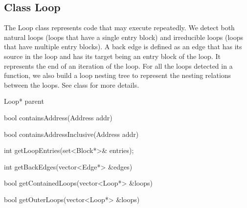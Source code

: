 \subsection{Class Loop}


The Loop class represents code that may execute repeatedly.
We detect both natural loops (loops that have a single entry block)
and irreducible loops (loops that have multiple entry blocks).
A back edge is defined as an edge that has its source in
the loop and has its target being an entry block of the loop.
It represents the end of an iteration of the loop.
For all the loops detected in a function, we also build a loop nesting 
tree to represent the nesting relations between the loops.
See class  for more details.

\begin{apient}
Loop* parent
\end{apient}


\begin{apient}
bool containsAddress(Address addr)
\end{apient}
	

\begin{apient}
bool containsAddressInclusive(Address addr)
\end{apient}

\begin{apient}
int getLoopEntries(set<Block*>& entries);
\end{apient}
        
		   
\begin{apient}
int getBackEdges(vector<Edge*> &edges)
\end{apient}
	
\begin{apient}
bool getContainedLoops(vector<Loop*> &loops)
\end{apient}

\begin{apient}
bool getOuterLoops(vector<Loop*> &loops)
\end{apient}

